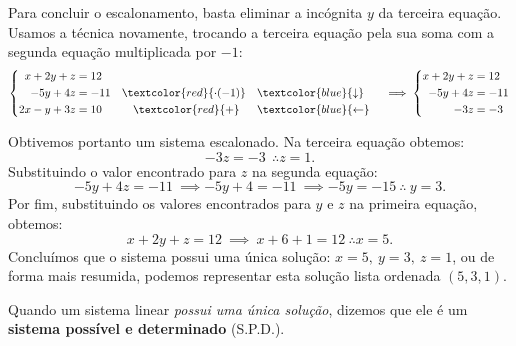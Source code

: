 \begin{example}{}
Para concluir o escalonamento, basta eliminar a incógnita $y$ da terceira equação. Usamos a técnica  novamente, trocando a terceira equação pela sua soma com a segunda equação multiplicada por $-1$:
\begin{equation*}
\left \{
\begin{aligned}
x+2y+z&=12 \\
-5y+4z&=-11  &&\textcolor{red}{\cdot(-1)} &&\vspace{1ex}\textcolor{blue}{\downarrow}\\
2x-y+3z&=10 &&\quad\textcolor{red}{+}  &&\textcolor{blue}{\leftarrow}
\end{aligned}
\right.
\implies
\left \{
\begin{aligned}
x+2y+z&=12\\
-5y+4z&=-11\\
-3z&=-3
\end{aligned}
\right.
\end{equation*}

Obtivemos portanto um sistema escalonado. Na terceira equação obtemos:
$$
-3z=-3 \ \ \therefore z = 1. 
$$ 
Substituindo o valor encontrado para $z$ na segunda equação:
$$
-5y +4z = -11 \ \implies -5y + 4 = -11 \ \implies -5y = -15 \ \therefore \ y = 3.
$$
Por fim, substituindo os valores encontrados para $y$ e $z$ na primeira equação, obtemos:
$$
x + 2y + z = 12 \ \implies \ x + 6 + 1 = 12 \ \therefore x = 5.
$$
Concluímos que o sistema possui uma única solução: $x = 5, \ y = 3, \ z = 1$, ou de forma mais resumida, podemos representar esta solução lista ordenada $(5,3,1)$.

Quando um sistema linear \emph{possui uma única solução}, dizemos que ele é um \textbf{sistema possível e determinado} (S.P.D.).
\end{example}



